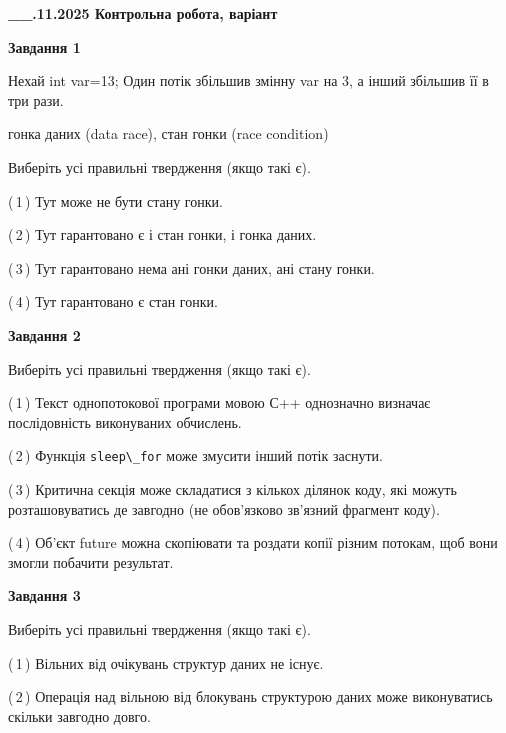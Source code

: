 \documentclass[12pt, ukrainian]{article}
\def\code#1{\Verb!#1!}
\begin{document}
\begin {large}

\textbf{\_\_.11.2025 Контрольна робота, варіант  }\par


{

\begin{center}
\textbf{Завдання 1}
\end{center}
Нехай int var=13; Один потік збільшив змінну var на 3, а інший збільшив її в три рази.

гонка даних (data race), стан гонки (race condition)

Виберіть усі правильні твердження (якщо такі є).\par
\vspace{2mm}
(\,1\,) Тут може не бути стану гонки.%

(\,2\,) Тут гарантовано є і стан гонки, і гонка даних.%

(\,3\,) Тут гарантовано нема ані гонки даних, ані стану гонки.%

(\,4\,) Тут гарантовано є стан гонки.%



\begin{center}
\textbf{Завдання 2}
\end{center}
Виберіть усі правильні твердження (якщо такі є).\par
\vspace{2mm}

(\,1\,) Текст однопотокової програми мовою С++ однозначно визначає послідовність виконуваних обчислень.%

(\,2\,) Функція \code{sleep\_for} може змусити інший потік заснути.%

(\,3\,) Критична секція може складатися з кількох ділянок коду, які можуть розташовуватись де завгодно (не обов’язково зв’язний фрагмент коду).%

(\,4\,) Об’єкт future можна скопіювати та роздати копії різним потокам, щоб вони змогли побачити результат.%



\begin{center}
\textbf{Завдання 3}
\end{center}
Виберіть усі правильні твердження (якщо такі є).\par
\vspace{2mm}

(\,1\,) Вільних від очікувань структур даних не існує.%

(\,2\,) Операція над вільною від блокувань структурою даних може виконуватись скільки завгодно довго.%

}
\end{large}
\end{document}
